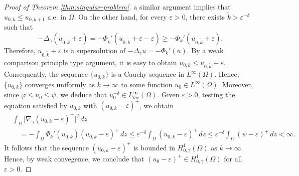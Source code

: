 \documentclass[11pt]{article}
\newcommand{\om} {\Omega}
\newcommand{\gradgr}{\nabla_{\gamma}}
\newcommand{\spacegr}{H^{1}_{0,\gamma}(\Omega)}
\begin{document}
\begin{proof}[Proof of Theorem \ref{thm:singular-problem}]
a similar argument implies that $u_{0,k} \le u_{0,k+1}$ a.e. in $\om$. On the other hand, for every $\varepsilon > 0$, there exists
$\tilde{k} > \varepsilon^{-\delta}$ such that
\begin{equation*}
-\Delta_{\gamma} (u_{0,\tilde{k}} + \varepsilon)
=
-\Phi_{\tilde{k}}'(u_{0,\tilde{k}} + \varepsilon - \varepsilon)
\ge
-\Phi_k'(u_{0,\tilde{k}} + \varepsilon).
\end{equation*}
Therefore, $u_{0,\tilde{k}} + \varepsilon$ is a supersolution of $-\Delta_{\gamma} u = -\Phi_k'(u)$. By a weak comparison principle type argument, it is easy to obtain $u_{0,k} \le u_{0,\tilde{k}} + \varepsilon$. Consequently, the sequence $\{u_{0,k}\}$ is a Cauchy sequence in $L^\infty(\Omega)$. Hence, $\{u_{0,k}\}$ converges uniformly as $k \to \infty$ to some function $u_0 \in L^\infty(\Omega)$. Moreover, since $\varphi \le u_0 \le \psi$, we deduce that $u_0^{-\delta} \in L^\infty_{loc}(\Omega)$. Given $\varepsilon > 0$, testing the equation satisfied by $u_{0,k}$ with $(u_{0,k}-\varepsilon)^+$, we obtain
\begin{equation*}
\begin{aligned}
&\int_\Omega
\bigl| \gradgr (u_{0,k}-\varepsilon)^+ \bigr|^2 \, dz \\
&\quad =
-
\int_\Omega
\Phi_k'(u_{0,k}) (u_{0,k}-\varepsilon)^+ \, dz
\le
\varepsilon^{-\delta}
\int_\Omega
(u_{0,k}-\varepsilon)^+ \, dz
\le
\varepsilon^{-\delta}
\int_\Omega
(\psi-\varepsilon)^+ \, dz
< \infty .
\end{aligned}
\end{equation*}
It follows that the sequence $(u_{0,k}-\varepsilon)^+$ is bounded in $\spacegr$ as $k \to \infty$. Hence, by weak convegence, we conclude that $(u_0 - \varepsilon)^+ \in \spacegr$ for all $\varepsilon > 0$. 


\end{proof}
\end{document}
